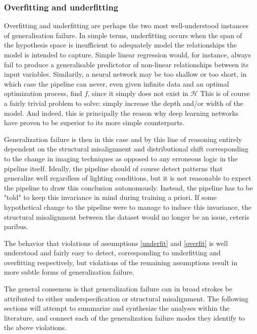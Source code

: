 		\subsubsection{Overfitting and underfitting}
	Overfitting and underfitting are perhaps the two most well-understood instances of generalisation failure. In simple terms, underfitting occurs when the span of the hypothesis space is insufficient to adequately model the relationships the model is intended to capture. Simple linear regression would, for instance, always fail to produce a generalisable predictotor of non-linear relationships between its input variables. Similarily, a neural network may be too shallow or too short, in which case the pipeline can never, even given infinite data and an optimal optimization process, find \(f\), since it simply does not exist in \(\mathcal{H}\) This is of course a fairly trivial problem to solve: simply increase the depth and/or width  of the model. And indeed, this is principally the reason why deep learning networks have proven to be superior to its more simple counterparts.
	

	Generalization failure is then in this case and by this line of reasoning entirely dependent on the structural misalignment and distributional shift corresponding to the change in imaging techniques as opposed to any erroneous logic in the pipeline itself. Ideally, the pipeline should of course detect patterns that generalize well regardless of lighting conditions, but it is not reasonable to expect the pipeline to draw this conclusion autonomously. Instead, the pipeline has to be "told" to keep this invariance in mind during training a priori. If some hypothetical change to the pipeline were to manage to induce this invariance, the structural misalignment between the dataset would no longer be an issue, ceteris paribus.

	The behavior that violations of assumptions \ref{underfit} and \ref{overfit} is well understood and fairly easy to detect, corresponding to underfitting and overfitting respectively, but violations of the remaining assumptions result in more subtle forms of generalization failure. 
		
	The general consensus is that generalization
	failure can in broad strokes be attributed to either underspecification or structural misalignment. The following sections will attempt to summarize and synthesize the analyses within the literature, and connect each of the generalization
	failure modes they identify to the above violations.

